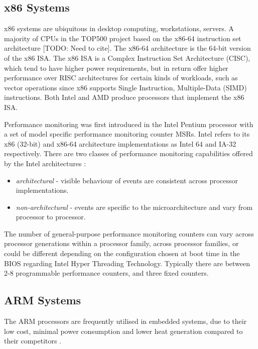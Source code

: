 {\subsection{x86 Systems}

x86 systems are ubiquitous in desktop computing, workstations, servers. A majority of CPUs in the TOP500 project based on the x86-64 instruction set architecture [TODO: Need to cite]. The x86-64 architecture is the 64-bit version of the x86 ISA. The x86 ISA is a Complex Instruction Set Architecture (CISC), which tend to have higher power requirements, but in return offer higher performance over RISC architectures for certain kinds of workloads, such as vector operations since x86 supports Single Instruction, Multiple-Data (SIMD) instructions. Both Intel and AMD produce processors that implement the x86 ISA.

Performance monitoring was first introduced in the Intel Pentium processor with a set of model specific performance monitoring counter MSRs. Intel refers to its x86 (32-bit) and x86-64 architecture implementations as Intel 64 and IA-32 respectively. There are two classes of performance monitoring capabilities offered by the Intel architectures \cite{DocsIntel64IA32Vol3B}:
\begin{itemize}
    \item \textit{architectural} - visible behaviour of events are consistent across processor implementations.
    \item \textit{non-architectural} - events are specific to the microarchitecture and vary from processor to processor.
\end{itemize}

The number of general-purpose performance monitoring counters can vary across processor generations within a processor family, across processor families, or could be different depending on the configuration chosen at boot time in the BIOS regarding Intel Hyper Threading Technology. Typically there are between 2-8 programmable performance counters, and three fixed counters.

\subsection{ARM Systems}

The ARM processors are frequently utilised in embedded systems, due to their low cost, minimal power consumption and lower heat generation compared to their competitors \cite{ArticleEmbeddedTwoPercSol}.

}
